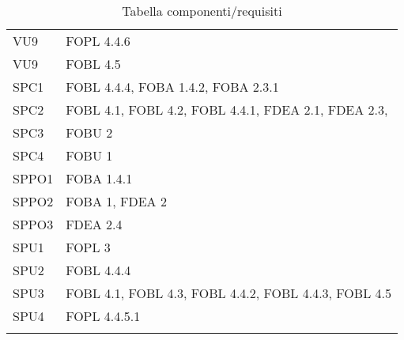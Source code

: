 \begin{longtable}{XX}
VU9&FOPL 4.4.6\\ 
VU9&FOBL 4.5\\ 
\midrule 
SPC1 & FOBL 4.4.4, FOBA 1.4.2, FOBA 2.3.1\\
\midrule
SPC2 & FOBL 4.1, FOBL 4.2, FOBL 4.4.1, FDEA 2.1, FDEA 2.3,  \\
\midrule
SPC3 & FOBU 2\\
\midrule
SPC4 & FOBU 1 \\
\midrule
SPPO1 & FOBA 1.4.1\\
\midrule
SPPO2 & FOBA 1, FDEA 2 \\
\midrule
SPPO3 & FDEA 2.4\\
\midrule
SPU1 & FOPL 3\\
\midrule
SPU2 & FOBL 4.4.4\\
\midrule
SPU3 & FOBL 4.1, FOBL 4.3, FOBL 4.4.2, FOBL 4.4.3, FOBL 4.5\\
\midrule
SPU4 & FOPL 4.4.5.1\\
\bottomrule
\caption{Tabella componenti/requisiti}
\end{longtable} 
